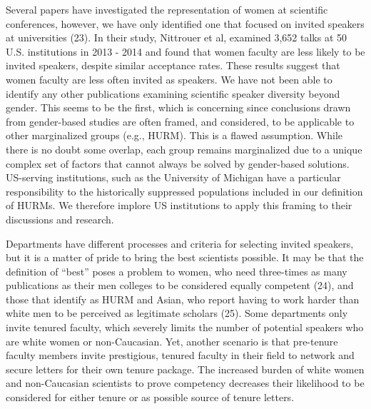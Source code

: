 \documentclass[10pt,]{article}
\begin{document}
Several papers have investigated the representation of women at
scientific conferences, however, we have only identified one that
focused on invited speakers at universities (23). In their study,
Nittrouer et al, examined 3,652 talks at 50 U.S. institutions in 2013 -
2014 and found that women faculty are less likely to be invited
speakers, despite similar acceptance rates. These results suggest that
women faculty are less often invited as speakers. We have not been able
to identify any other publications examining scientific speaker
diversity beyond gender. This seems to be the first, which is concerning
since conclusions drawn from gender-based studies are often framed, and
considered, to be applicable to other marginalized groups (e.g., HURM).
This is a flawed assumption. While there is no doubt some overlap, each
group remains marginalized due to a unique complex set of factors that
cannot always be solved by gender-based solutions. US-serving
institutions, such as the University of Michigan have a particular
responsibility to the historically suppressed populations included in
our definition of HURMs. We therefore implore US institutions to apply
this framing to their discussions and research.

Departments have different processes and criteria for selecting invited
speakers, but it is a matter of pride to bring the best scientists
possible. It may be that the definition of ``best'' poses a problem to
women, who need three-times as many publications as their men colleges
to be considered equally competent (24), and those that identify as HURM
and Asian, who report having to work harder than white men to be
perceived as legitimate scholars (25). Some departments only invite
tenured faculty, which severely limits the number of potential speakers
who are white women or non-Caucasian. Yet, another scenario is that
pre-tenure faculty members invite prestigious, tenured faculty in their
field to network and secure letters for their own tenure package. The
increased burden of white women and non-Caucasian scientists to prove
competency decreases their likelihood to be considered for either tenure
or as possible source of tenure letters.
\end{document}
